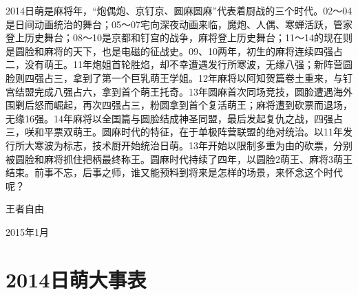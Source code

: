 2014日萌是麻将年，“炮偶炮、京钉京、圆麻圆麻”代表着厨战的三个时代。02～04是日间动画统治的舞台；05～07宅向深夜动画来临，魔炮、人偶、寒蝉活跃，管家登上历史舞台；08～10是京都和钉宫的战争，麻将登上历史舞台；11～14的现在则是圆脸和麻将的天下，也是电磁的征战史。09、10两年，初生的麻将连续四强占二，没有萌王。11年炮姐首轮胜焰，却不幸遭遇发行所寒波，无缘八强；新阵营圆脸则四强占三，拿到了第一个巨乳萌王学姐。12年麻将以阿知贺篇卷土重来，与钉宫结盟完成八强占六，拿到首个萌王托奇。13年圆麻首次同场竞技，圆脸遭遇海外围剿后怒而崛起，再次四强占三，粉圆拿到首个复活萌王；麻将遭到砍票而退场，无缘16强。14年麻将以全国篇与圆脸结成神圣同盟，最后发起复仇之战，四强占三，咲和平票双萌王。圆麻时代的特征，在于单极阵营联盟的绝对统治。以11年发行所大寒波为标志，技术厨开始统治日萌。13年开始以限制多重为由的砍票，分别被圆脸和麻将抓住把柄最终称王。圆麻时代持续了四年，以圆脸2萌王、麻将3萌王结束。前事不忘，后事之师，谁又能预料到将来是怎样的场景，来怀念这个时代呢？

\begin{flushright}
  \rm\kasho 王者自由

  \kai 2015年1月
\end{flushright}

\chapter*{2014日萌大事表}

